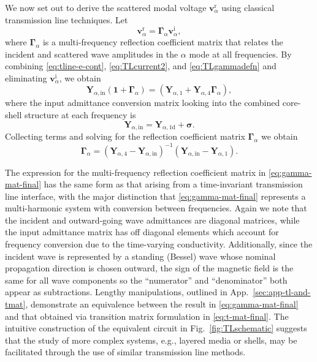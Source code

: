 \documentclass[article]{IEEEtran}
\newcommand{\M}[1]{\mathbf{#1}}
\newcommand{\T}[1]{\mathrm{#1}}
\newcommand{\V}[1]{\boldsymbol{#1}}
\begin{document}
We now set out to derive the scattered modal voltage $\M{v}^\T{r}_\alpha$ using classical transmission line techniques.  Let 
\begin{equation}\label{eq:TLgammadefn}
    \M{v}^\T{r}_\alpha = \M{\Gamma}_\alpha \M{v}^\T{i}_{\alpha},
\end{equation}
where $\M{\Gamma}_\alpha$ is a multi-frequency reflection coefficient matrix that relates the incident and scattered wave amplitudes in the $\alpha$ mode at all frequencies.
By combining \eqref{eq:tline-e-cont}, \eqref{eq:TLcurrent2}, and \eqref{eq:TLgammadefn} and eliminating $\M{v}^\T{i}_\alpha$, we obtain
\begin{equation}
   \M{Y}_{\alpha, \T{in}} \left(\V{1}+\M{\Gamma}_\alpha\right)
    = (\M{Y}_{\alpha,1} + \M{Y}_{\alpha,4}\M{\Gamma}_\alpha ),
\end{equation}
where the input admittance conversion matrix looking into the combined core-shell structure at each frequency is
\begin{equation}
    \M{Y}_{\alpha, \T{in}} = \M{Y}_{\alpha,1\T{d}} +\V{\sigma}.
\end{equation}
Collecting terms and solving for the reflection coefficient matrix $\M{\Gamma}_\alpha$ we obtain
\begin{equation}
    \M{\Gamma}_\alpha = (\M{Y}_{\alpha,4}-\M{Y}_{\alpha, \T{in}})^{-1}(\M{Y}_{\alpha, \T{in}}- \M{Y}_{\alpha,1}).
    \label{eq:gamma-mat-final}
\end{equation}

The expression for the multi-frequency reflection coefficient matrix in \eqref{eq:gamma-mat-final} has the same form as that arising from a time-invariant transmission line interface, with the major distinction that \eqref{eq:gamma-mat-final} represents a multi-harmonic system with conversion between frequencies. Again we note that the incident and outward-going wave admittances are diagonal matrices, while the input admittance matrix has off diagonal elements which account for frequency conversion due to the time-varying conductivity.  Additionally, since the incident wave is represented by a standing (Bessel) wave whose nominal propagation direction is chosen outward, the sign of the magnetic field is the same for all wave components so the ``numerator'' and ``denominator'' both appear as subtractions.  Lengthy manipulations, outlined in App.~\ref{sec:app-tl-and-tmat}, demonstrate an equivalence between the result in \eqref{eq:gamma-mat-final} and that obtained via transition matrix formulation in \eqref{eq:t-mat-final}.  The intuitive construction of the equivalent circuit in Fig.~\ref{fig:TLschematic} suggests that the study of more complex systems, e.g., layered media or shells, may be facilitated through the use of similar transmission line methods.
\end{document}
